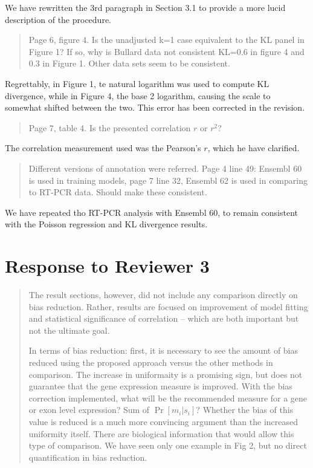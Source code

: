 \documentclass{article}
\begin{document}
We have rewritten the 3rd paragraph in Section 3.1 to provide a more lucid
description of the procedure.


\begin{quote}
Page 6, figure 4. Is the unadjusted k=1 case equivalent to the KL panel in
Figure 1? If so, why is Bullard data not consistent KL=0.6 in figure 4 and 0.3
in Figure 1. Other data sets seem to be consistent.
\end{quote}

Regrettably, in Figure 1, te natural logarithm was used to compute KL
divergence, while in Figure 4, the base 2 logarithm, causing the scale to
somewhat shifted between the two. This error has been corrected in the revision.


\begin{quote}
Page 7, table 4. Is the presented correlation $r$ or $r^2$?
\end{quote}

The correlation measurement used was the Pearson's $r$, which he have clarified.


\begin{quote}
Different versions of annotation were referred. Page 4 line 49: Ensembl 60 is
used in training models, page 7 line 32, Ensembl 62 is used in comparing to
RT-PCR data. Should make these consistent.
\end{quote}

We have repeated tho RT-PCR analysis with Ensembl 60, to remain consistent with
the Poisson regression and KL divergence results.


\section*{Response to Reviewer 3}


\begin{quote}
The result sections, however, did not include any comparison directly
on bias reduction. Rather, results are focused on improvement of model
fitting and statistical significance of correlation -- which are both
important but not the ultimate goal.

In terms of bias reduction: first, it is necessary to see the amount of bias
reduced using the proposed approach versus the other methods in
comparison.  The increase in uniformaity is a promising sign, but does
not guarantee that the gene expression measure is improved.  With the
bias correction implemented, what will be the recommended measure for
a gene or exon level expression? Sum of $\Pr[m_i|s_i]$? Whether the bias of
this value is reduced is a much more convincing argument than the
increased uniformity itself. There are  biological information that
would allow this type of comparison. We have seen only one example in
Fig 2, but no direct quantification in bias reduction.
\end{quote}
\end{document}

